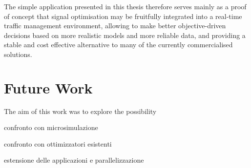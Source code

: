 The simple application presented in this thesis therefore serves mainly as a proof of concept that signal optimisation may be fruitfully integrated into a real-time traffic management environment, allowing to make better objective-driven decisions based on more realistic models and more reliable data, and providing a stable and cost effective alternative to many of the currently commercialised solutions.


\pagebreak
\section{Future Work}
The aim of this work was to explore the possibility 

confronto con microsimulazione

confronto con ottimizzatori esistenti

estensione delle applicazioni e parallelizzazione